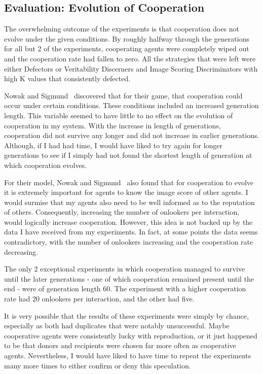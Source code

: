 \documentclass[]{final_report}
\begin{document}
\subsection{Evaluation: Evolution of Cooperation}
The overwhelming outcome of the experiments is that cooperation does not evolve under the given conditions. By roughly halfway through the generations for all but 2 of the experiments, cooperating agents were completely wiped out and the cooperation rate had fallen to zero. All the strategies that were left were either Defectors or Veritability Discerners and Image Scoring Discriminators with high K values that consistently defected.\par 
Nowak and Sigmund~\cite{evol_indirect_image} discovered that for their game, that cooperation could occur under certain conditions. These conditions included an increased generation length. This variable seemed to have little to no effect on the evolution of cooperation in my system. With the increase in length of generations, cooperation did not survive any longer and did not increase in earlier generations. Although, if I had had time, I would have liked to try again for longer generations to see if I simply had not found the shortest length of generation at which cooperation evolves.\par 
For their model, Nowak and Sigmund~\cite{evol_indirect_image} also found that for cooperation to evolve it is extremely important for agents to know the image score of other agents. I would surmise that my agents also need to be well informed as to the reputation of others. Consequently, increasing the number of onlookers per interaction, would logically increase cooperation. However, this idea is not backed up by the data I have received from my experiments. In fact, at some points the data seems contradictory, with the number of onlookers increasing and the cooperation rate decreasing.\par 
The only 2 exceptional experiments in which cooperation managed to survive until the later generations - one of which cooperation remained present until the end - were of generation length 60. The experiment with a higher cooperation rate had 20 onlookers per interaction, and the other had five.\par 
It is very possible that the results of these experiments were simply by chance, especially as both had duplicates that were notably unsuccessful. Maybe cooperative agents were consistently lucky with reproduction, or it just happened to be that donors and recipients were chosen far more often as cooperative agents. Nevertheless, I would have liked to have time to repeat the experiments many more times to either confirm or deny this speculation.
\end{document}
